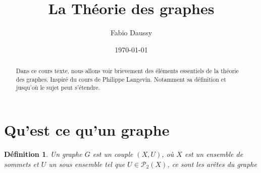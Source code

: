 \documentclass[12pt,a4paper]{scrartcl}
\title{La Théorie des graphes}
\author{Fabio Daussy}
\date{\today}
\theoremstyle{plain}
\newtheorem{definition}[theoreme]{Définition}
\begin{document}
\maketitle

\begin{abstract}
Dans ce cours texte, nous allons voir brievement des éléments essentiels de la théorie des graphes. Inspiré du cours de Philippe Langevin.
Notamment sa définition et jusqu'où le sujet peut s'étendre.
\end{abstract}

\tableofcontents


\section{Qu'est ce qu'un graphe}

\begin{definition}
Un graphe $G$ est un couple $(X,U)$, où $X$ est un ensemble de sommets et
$U$ un sous ensemble tel que $U \in \mathcal{P}_2(X)$, ce sont les arêtes du graphe 
\end{definition}
\end{document}
